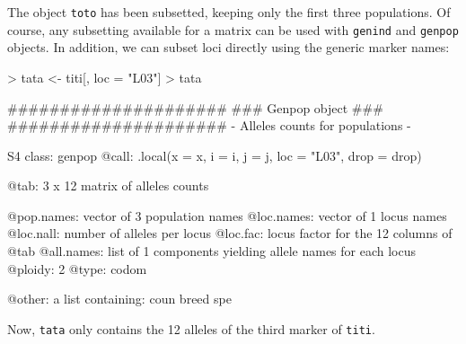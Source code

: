 \documentclass{article}
\begin{document}
\noindent The object \texttt{toto} has been subsetted, keeping only the
first three populations.
Of course, any subsetting available for a matrix can be used with \texttt{genind} and \texttt{genpop} objects.
In addition, we can subset loci directly using the generic marker names:
\begin{Schunk}
\begin{Sinput}
> tata <- titi[, loc = "L03"]
> tata
\end{Sinput}
\begin{Soutput}
       #####################
       ### Genpop object ### 
       #####################
- Alleles counts for populations - 

S4 class:  genpop
@call: .local(x = x, i = i, j = j, loc = "L03", drop = drop)

@tab:  3 x 12 matrix of alleles counts

@pop.names: vector of  3 population names
@loc.names: vector of  1 locus names
@loc.nall: number of alleles per locus
@loc.fac: locus factor for the  12 columns of @tab
@all.names: list of  1 components yielding allele names for each locus
@ploidy:  2
@type:  codom

@other: a list containing: coun  breed  spe 
\end{Soutput}
\end{Schunk}

\noindent Now, \texttt{tata} only contains the 12 alleles of the third
marker of \texttt{titi}.
\\
\end{document}
